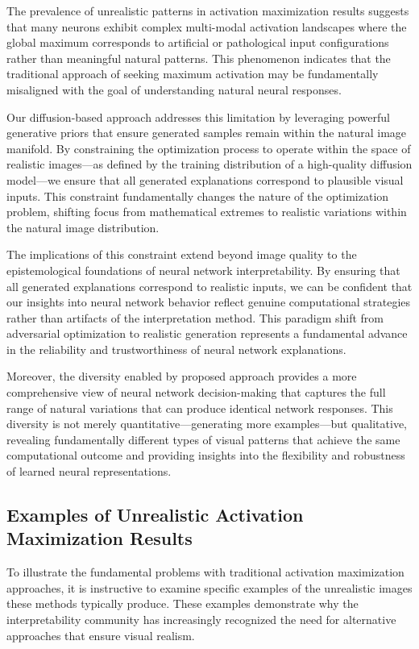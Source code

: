 \documentclass[licencjacka,en]{pracamgr}
\begin{document}
The prevalence of unrealistic patterns in activation maximization results suggests that many neurons exhibit complex multi-modal activation landscapes where the global maximum corresponds to artificial or pathological input configurations rather than meaningful natural patterns. This phenomenon indicates that the traditional approach of seeking maximum activation may be fundamentally misaligned with the goal of understanding natural neural responses.

Our diffusion-based approach addresses this limitation by leveraging powerful generative priors that ensure generated samples remain within the natural image manifold. By constraining the optimization process to operate within the space of realistic images—as defined by the training distribution of a high-quality diffusion model—we ensure that all generated explanations correspond to plausible visual inputs. This constraint fundamentally changes the nature of the optimization problem, shifting focus from mathematical extremes to realistic variations within the natural image distribution.

The implications of this constraint extend beyond image quality to the epistemological foundations of neural network interpretability. By ensuring that all generated explanations correspond to realistic inputs, we can be confident that our insights into neural network behavior reflect genuine computational strategies rather than artifacts of the interpretation method. This paradigm shift from adversarial optimization to realistic generation represents a fundamental advance in the reliability and trustworthiness of neural network explanations.

Moreover, the diversity enabled by proposed approach provides a more comprehensive view of neural network decision-making that captures the full range of natural variations that can produce identical network responses. This diversity is not merely quantitative—generating more examples—but qualitative, revealing fundamentally different types of visual patterns that achieve the same computational outcome and providing insights into the flexibility and robustness of learned neural representations.

\subsection{Examples of Unrealistic Activation Maximization Results}

To illustrate the fundamental problems with traditional activation maximization approaches, it is instructive to examine specific examples of the unrealistic images these methods typically produce. These examples demonstrate why the interpretability community has increasingly recognized the need for alternative approaches that ensure visual realism.
\end{document}
